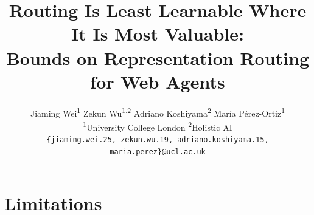 \documentclass{article}
\title{Routing Is Least Learnable Where It Is Most Valuable:\\
  Bounds on Representation Routing for Web Agents}
\author{%
  Jiaming Wei\textsuperscript{1} \quad
  Zekun Wu\textsuperscript{1,2} \quad
  Adriano Koshiyama\textsuperscript{2} \quad
  Mar\'ia P\'erez-Ortiz\textsuperscript{1} \\
  \textsuperscript{1}University College London \quad
  \textsuperscript{2}Holistic AI \\
  {\small\texttt{\{jiaming.wei.25, zekun.wu.19, adriano.koshiyama.15,
  maria.perez\}@ucl.ac.uk}}
}
\begin{document}
\maketitle

\begin{abstract}

\end{abstract}










\label{content-end}

\label{refs-start}



\clearpage
\appendix



\section{Limitations}\label{app:limitations}





\end{document}
